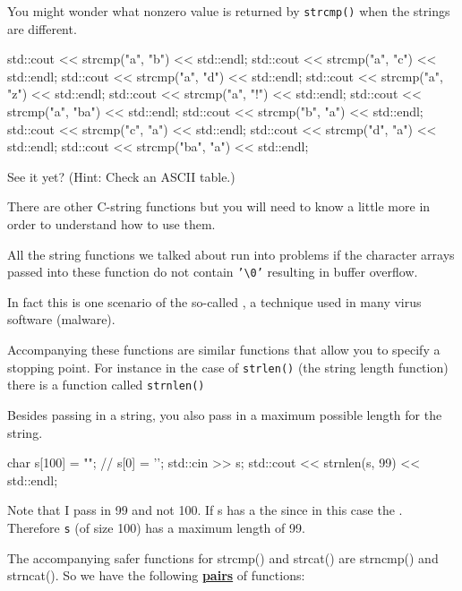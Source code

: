 You might wonder what nonzero value is returned by \texttt{strcmp()} when the strings are different.

\begin{consolethree}[escapeinside=||]
std::cout << strcmp("a", "b") << std::endl;
std::cout << strcmp("a", "c") << std::endl;
std::cout << strcmp("a", "d") << std::endl;
std::cout << strcmp("a", "z") << std::endl;
std::cout << strcmp("a", "!") << std::endl;
std::cout << strcmp("a", "ba") << std::endl;
std::cout << strcmp("b", "a") << std::endl;
std::cout << strcmp("c", "a") << std::endl;
std::cout << strcmp("d", "a") << std::endl;
std::cout << strcmp("ba", "a") << std::endl;
\end{consolethree}

See it yet? (Hint: Check an ASCII table.)

There are other C-string functions but you will need to know a little more in order to understand how to use them.


\newpage{}

All the string functions we talked about run into problems if the character arrays passed into these function do not contain \texttt{'\textbackslash 0'} resulting in buffer overflow.

In fact this is one scenario of the so-called , a technique used in many virus software (malware).

Accompanying these functions are similar functions that allow you to specify a stopping point. For instance in the case of \verb!strlen()! (the string length function) there is a function called \verb!strnlen()!

Besides passing in a string, you also pass in a maximum possible length
for the string.

\begin{consolethree}[escapeinside=||]
char s[100] = ""; // s[0] = '\0';
std::cin >> s;
std::cout << strnlen(s, 99) << std::endl;
\end{consolethree}

Note that I pass in 99 and not 100. If s has a  the  since in this case the . Therefore \texttt{s} (of size 100) has a maximum length of 99.


The accompanying safer functions for strcmp() and strcat() are strncmp() and strncat(). So we have the following \textbf{\underline{pairs}} of functions:

